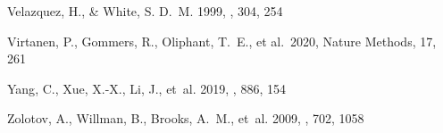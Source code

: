 \documentclass[twocolumn,tighten,twocolappendix]{aastex63}
\begin{document}
\begin{CJK*}{UTF8}{gbsn}
\begin{thebibliography}{}
{Velazquez}, H., \& {White}, S. D.~M. 1999, \mnras, 304, 254

 Virtanen, P., Gommers, R., Oliphant, T.~E., et al.\ 2020, Nature Methods, 17, 261

{Yang}, C., {Xue}, X.-X., {Li}, J., {et~al.} 2019, \apj, 886, 154

{Zolotov}, A., {Willman}, B., {Brooks}, A.~M., {et~al.} 2009, \apj, 702, 1058

\end{thebibliography}
\end{CJK*}
\end{document}
